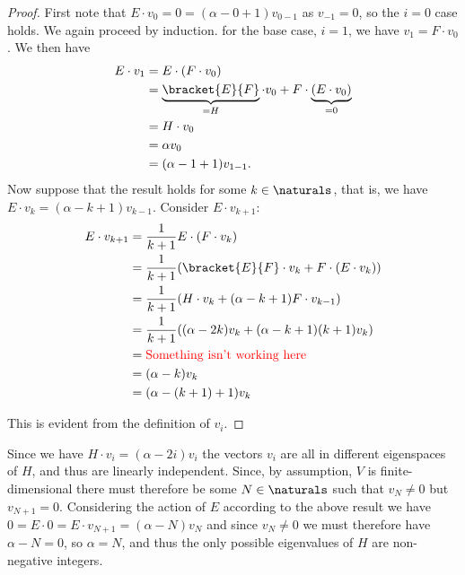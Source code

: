 \documentclass[fleqn]{NotesClass}
\begin{document}
\begin{lma}{}{}
\begin{proof}
            First note that \(E \cdot v_0 = 0 = (\alpha - 0 + 1)v_{0-1}\) as \(v_{-1} = 0\), so the \(i = 0\) case holds.
            We again proceed by induction.
            for the base case, \(i = 1\), we have \(v_1 = F \cdot v_0\).
            We then have
            \begin{align}
                E \cdot v_1 &= E \cdot (F \cdot v_0)\\
                &= \underbrace{\bracket{E}{F}}_{=H} \cdot v_0 + F \cdot \underbrace{(E \cdot v_0)}_{=0}\\
                &= H \cdot v_0\\
                &= \alpha v_0\\
                &= (\alpha - 1 + 1)v_{1 - 1}.
            \end{align}
            Now suppose that the result holds for some \(k \in \naturals\), that is, we have \(E \cdot v_k = (\alpha - k + 1)v_{k - 1}\).
            Consider \(E \cdot v_{k+1}\):
            \begin{align}
                E \cdot v_{k+1} &= \frac{1}{k + 1}E \cdot (F \cdot v_k)\\
                &= \frac{1}{k + 1}(\bracket{E}{F} \cdot v_k + F \cdot (E \cdot v_k))\\
                &= \frac{1}{k + 1}(H \cdot v_k + (\alpha - k + 1)F \cdot v_{k-1})\\
                &= \frac{1}{k + 1}((\alpha - 2k)v_k + (\alpha - k + 1)(k + 1)v_k)\\
                &= \text{\textcolor{red}{Something isn't working here}}\\ %
                &= (\alpha - k)v_k\\
                &= (\alpha - (k + 1) + 1)v_k
            \end{align}
            
            This is evident from the definition of \(v_i\).
        \end{proof}
    \end{lma}
    
    Since we have \(H \cdot v_i = (\alpha - 2i)v_i\) the vectors \(v_i\) are all in different eigenspaces of \(H\), and thus are linearly independent.
    Since, by assumption, \(V\) is finite-dimensional there must therefore be some \(N \in \naturals\) such that \(v_N \ne 0\) but \(v_{N + 1} = 0\).
    Considering the action of \(E\) according to the above result we have \(0 = E \cdot 0 = E \cdot v_{N+1} = (\alpha - N)v_N\) and since \(v_N \ne 0\) we must therefore have \(\alpha - N = 0\), so \(\alpha = N\), and thus the only possible eigenvalues of \(H\) are non-negative integers.
    
\end{document}
